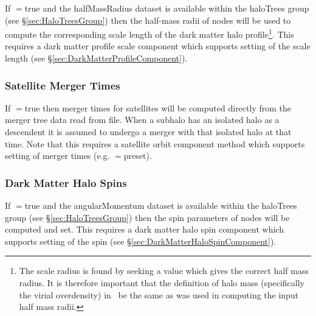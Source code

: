 If {\normalfont \ttfamily [mergerTreeReadPresetScaleRadii]}$=${\normalfont \ttfamily true} and the {\normalfont \ttfamily halfMassRadius} dataset is available within the {\normalfont \ttfamily haloTrees} group (see \S\ref{sec:HaloTreesGroup}) then the half-mass radii of nodes will be used to compute the corresponding scale length of the dark matter halo profile\footnote{The scale radius is found by seeking a value which gives the correct half mass radius. It is therefore important that the definition of halo mass (specifically the virial overdensity) in \protect\glc\ be the same as was used in computing the input half mass radii.}. This requires a dark matter profile scale component which supports setting of the scale length (see \S\ref{sec:DarkMatterProfileComponent}).

\subsubsection{Satellite Merger Times}

If {\normalfont \ttfamily [mergerTreeReadPresetMergerTimes]}$=${\normalfont \ttfamily true} then merger times for satellites will be computed directly from the merger tree data read from file. When a subhalo has an isolated halo as a descendent it is assumed to undergo a merger with that isolated halo at that time. Note that this requires a satellite orbit component method which supports setting of merger times (e.g. {\normalfont \ttfamily [treeNodeMethodSatelliteOrbit]}$=${\normalfont \ttfamily preset}).

\subsubsection{Dark Matter Halo Spins}

If {\normalfont \ttfamily [mergerTreeReadPresetSpins]}$=${\normalfont \ttfamily true} and the {\normalfont \ttfamily angularMomentum} dataset is available within the {\normalfont \ttfamily haloTrees} group (see \S\ref{sec:HaloTreesGroup}) then the spin parameters of nodes will be computed and set. This requires a dark matter halo spin component which supports setting of the spin (see \S\ref{sec:DarkMatterHaloSpinComponent}).
